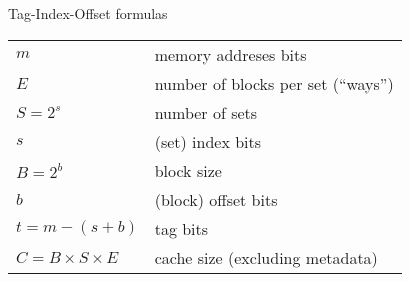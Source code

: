 \begin{frame}{Tag-Index-Offset formulas}
\def\arraystretch{1.5}
\begin{tabular}{ll}
$m$ & memory addreses bits \\
$E$ & number of blocks per set (``ways'') \\
$S=2^s$ & number of sets \\
$s$  & (set) index bits \\
$B=2^b$ & block size \\
$b$ & (block) offset bits \\
$t = m - (s+b)$ & tag bits \\
$C = B \times S \times E$ & cache size (excluding metadata) \\
\end{tabular}
\end{frame}
